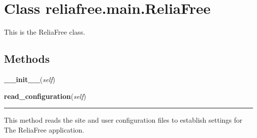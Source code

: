 %
%
%


\section{Class reliafree.main.ReliaFree}

    \label{reliafree:main:ReliaFree}
This is the ReliaFree class.



  \subsection{Methods}

    \label{reliafree:main:ReliaFree:__init__}

    \vspace{0.5ex}

\hspace{.8\funcindent}\begin{boxedminipage}{\funcwidth}

    \raggedright \textbf{\_\_init\_\_}(\textit{self})

\setlength{\parskip}{2ex}
\setlength{\parskip}{1ex}
    \end{boxedminipage}

    \label{reliafree:main:ReliaFree:read_configuration}

    \vspace{0.5ex}

\hspace{.8\funcindent}\begin{boxedminipage}{\funcwidth}

    \raggedright \textbf{read\_configuration}(\textit{self})

    \vspace{-1.5ex}

    \rule{\textwidth}{0.5\fboxrule}
\setlength{\parskip}{2ex}
    This method reads the site and user configuration files to establish 
    settings for The ReliaFree application.

\setlength{\parskip}{1ex}
    \end{boxedminipage}

